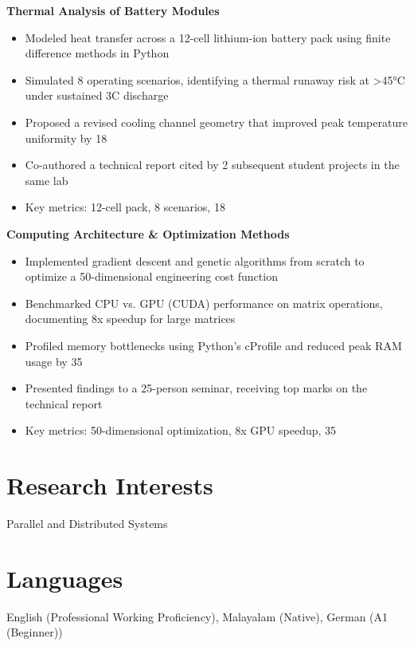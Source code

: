 \documentclass[11pt,a4paper]{article}
\begin{document}
\textbf{ Thermal Analysis of Battery Modules }
\begin{itemize}[leftmargin=*,nosep,topsep=2pt]
    
    \item Modeled heat transfer across a 12-cell lithium-ion battery pack using finite difference methods in Python
    
    \item Simulated 8 operating scenarios, identifying a thermal runaway risk at >45°C under sustained 3C discharge
    
    \item Proposed a revised cooling channel geometry that improved peak temperature uniformity by 18%
    
    \item Co-authored a technical report cited by 2 subsequent student projects in the same lab
    
    \item Key metrics: 12-cell pack, 8 scenarios, 18%
    
\end{itemize}

\textbf{ Computing Architecture & Optimization Methods }
\begin{itemize}[leftmargin=*,nosep,topsep=2pt]
    
    \item Implemented gradient descent and genetic algorithms from scratch to optimize a 50-dimensional engineering cost function
    
    \item Benchmarked CPU vs. GPU (CUDA) performance on matrix operations, documenting 8x speedup for large matrices
    
    \item Profiled memory bottlenecks using Python's cProfile and reduced peak RAM usage by 35%
    
    \item Presented findings to a 25-person seminar, receiving top marks on the technical report
    
    \item Key metrics: 50-dimensional optimization, 8x GPU speedup, 35%
    
\end{itemize}


\section{Research Interests}
Parallel and Distributed Systems

\section{Languages}
English (Professional Working Proficiency), Malayalam (Native), German (A1 (Beginner))
\end{document}
